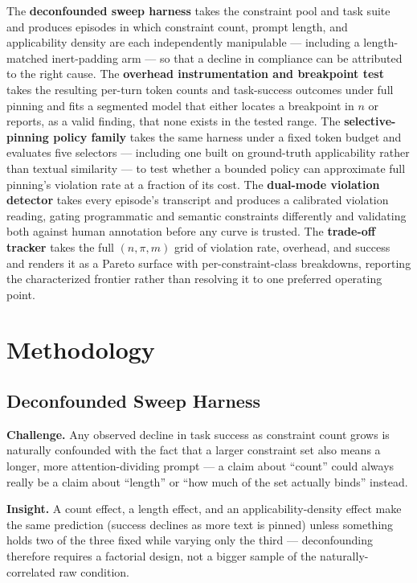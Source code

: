 \documentclass[11pt]{article}
\begin{document}
The \textbf{deconfounded sweep harness} takes the constraint pool and task suite and produces episodes in which constraint count, prompt length, and applicability density are each independently manipulable --- including a length-matched inert-padding arm --- so that a decline in compliance can be attributed to the right cause. The \textbf{overhead instrumentation and breakpoint test} takes the resulting per-turn token counts and task-success outcomes under full pinning and fits a segmented model that either locates a breakpoint in $n$ or reports, as a valid finding, that none exists in the tested range. The \textbf{selective-pinning policy family} takes the same harness under a fixed token budget and evaluates five selectors --- including one built on ground-truth applicability rather than textual similarity --- to test whether a bounded policy can approximate full pinning's violation rate at a fraction of its cost. The \textbf{dual-mode violation detector} takes every episode's transcript and produces a calibrated violation reading, gating programmatic and semantic constraints differently and validating both against human annotation before any curve is trusted. The \textbf{trade-off tracker} takes the full $(n, \pi, m)$ grid of violation rate, overhead, and success and renders it as a Pareto surface with per-constraint-class breakdowns, reporting the characterized frontier rather than resolving it to one preferred operating point.

\section{Methodology}

\subsection{Deconfounded Sweep Harness}
\textbf{Challenge.} Any observed decline in task success as constraint count grows is naturally confounded with the fact that a larger constraint set also means a longer, more attention-dividing prompt --- a claim about ``count'' could always really be a claim about ``length'' or ``how much of the set actually binds'' instead.

\textbf{Insight.} A count effect, a length effect, and an applicability-density effect make the same prediction (success declines as more text is pinned) unless something holds two of the three fixed while varying only the third --- deconfounding therefore requires a factorial design, not a bigger sample of the naturally-correlated raw condition.
\end{document}

